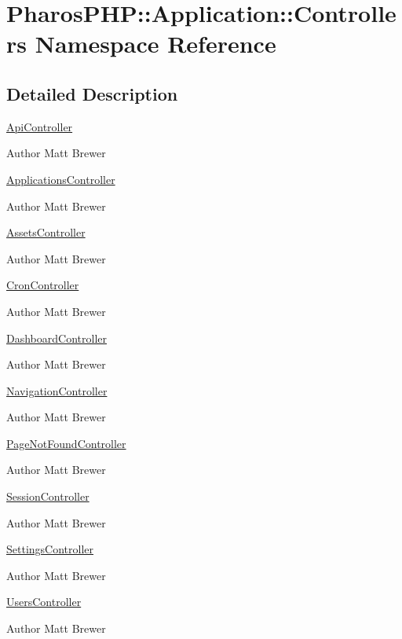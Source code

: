 \hypertarget{namespace_pharos_p_h_p_1_1_application_1_1_controllers}{
\section{PharosPHP::Application::Controllers Namespace Reference}
\label{namespace_pharos_p_h_p_1_1_application_1_1_controllers}
}


\subsection{Detailed Description}
\hyperlink{class_api_controller}{ApiController}

\begin{DoxyAuthor}{Author}
Matt Brewer
\end{DoxyAuthor}
\hyperlink{class_applications_controller}{ApplicationsController}

\begin{DoxyAuthor}{Author}
Matt Brewer
\end{DoxyAuthor}
\hyperlink{class_assets_controller}{AssetsController}

\begin{DoxyAuthor}{Author}
Matt Brewer
\end{DoxyAuthor}
\hyperlink{class_cron_controller}{CronController}

\begin{DoxyAuthor}{Author}
Matt Brewer
\end{DoxyAuthor}
\hyperlink{class_dashboard_controller}{DashboardController}

\begin{DoxyAuthor}{Author}
Matt Brewer
\end{DoxyAuthor}
\hyperlink{class_navigation_controller}{NavigationController}

\begin{DoxyAuthor}{Author}
Matt Brewer
\end{DoxyAuthor}
\hyperlink{class_page_not_found_controller}{PageNotFoundController}

\begin{DoxyAuthor}{Author}
Matt Brewer
\end{DoxyAuthor}
\hyperlink{class_session_controller}{SessionController}

\begin{DoxyAuthor}{Author}
Matt Brewer
\end{DoxyAuthor}
\hyperlink{class_settings_controller}{SettingsController}

\begin{DoxyAuthor}{Author}
Matt Brewer
\end{DoxyAuthor}
\hyperlink{class_users_controller}{UsersController}

\begin{DoxyAuthor}{Author}
Matt Brewer 
\end{DoxyAuthor}
